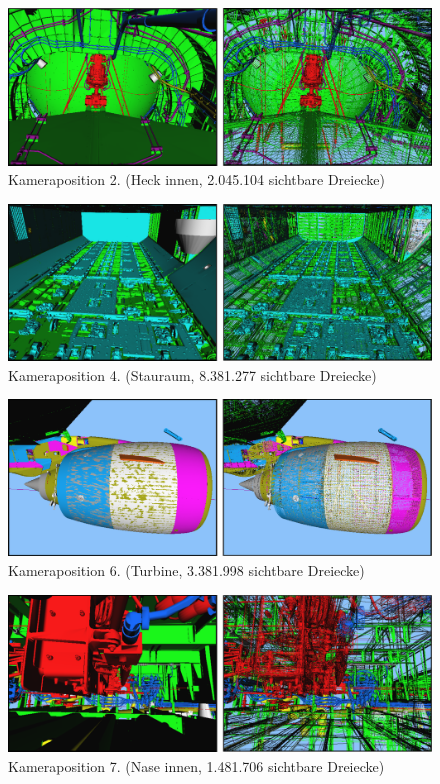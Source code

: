 
\begin{figure}[h]
\centering
\includegraphics[width=\hsize]{images/pos2.pdf}
\caption[Kameraposition 2]{\label{fig:eval:pos2}Kameraposition 2. (Heck innen, 2.045.104 sichtbare Dreiecke)}
\end{figure}


\begin{figure}[h]
\centering
\includegraphics[width=\hsize]{images/pos4.pdf}
\caption[Kameraposition 4]{\label{fig:eval:pos4}Kameraposition 4. (Stauraum, 8.381.277 sichtbare Dreiecke)}
\end{figure}


\begin{figure}[h]
\centering
\includegraphics[width=\hsize]{images/pos6.pdf}
\caption[Kameraposition 6]{\label{fig:eval:pos6}Kameraposition 6. (Turbine, 3.381.998 sichtbare Dreiecke)}
\end{figure}


\begin{figure}
\centering
\includegraphics[width=\hsize]{images/pos7.pdf}
\caption[Kameraposition 7]{\label{fig:eval:pos7}Kameraposition 7. (Nase innen, 1.481.706 sichtbare Dreiecke)}
\end{figure}

